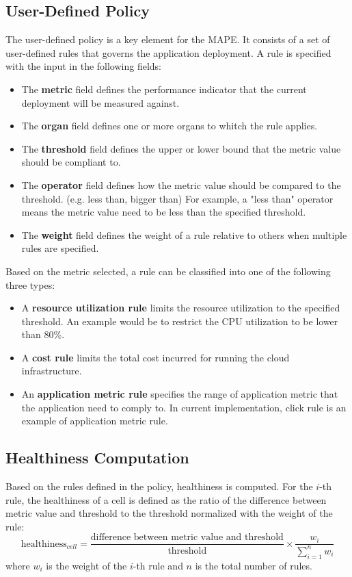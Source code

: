 \documentclass{seal_thesis}
\begin{document}
\subsection{User-Defined Policy}
The user-defined policy is a key element for the MAPE.
It consists of a set of user-defined rules that governs the application deployment.
A rule is specified with the input in the following fields:
\begin{itemize}
\item The \textbf{metric} field defines the performance indicator that the current deployment will be measured against.
\item The \textbf{organ} field defines one or more organs to whitch the rule applies.
\item The \textbf{threshold} field defines the upper or lower bound that the metric value should be compliant to.
\item The \textbf{operator} field defines how the metric value should be compared to the threshold. (e.g. less than, bigger than)
For example, a "less than" operator means the metric value need to be less than the specified threshold.
\item The \textbf{weight} field defines the weight of a rule relative to others when multiple rules are specified.
\end{itemize}
Based on the metric selected, a rule can be classified into one of the following three types:
\begin{itemize}
\item A \textbf{resource utilization rule} limits the resource utilization to the specified threshold.
An example would be to restrict the CPU utilization to be lower than 80\%.
\item A \textbf{cost rule} limits the total cost incurred for running the cloud infrastructure.
\item An \textbf{application metric rule} specifies the range of application metric that the application need to comply to.
In current implementation, click rule is an example of application metric rule.
\end{itemize}

\subsection{Healthiness Computation}
Based on the rules defined in the policy, healthiness is computed.
For the $i$-th rule, the healthiness of a cell is defined as the ratio of the difference between metric value and threshold to the threshold normalized with the weight of the rule:
\[ \textrm{healthiness}_{cell} = \frac{\textrm{difference between metric value and threshold}}{\textrm{threshold}} \times \frac{w_i}{\sum_{i=1}^{n}{w_i}}\]
where $w_i$ is the weight of the $i$-th rule and $n$ is the total number of rules.
\end{document}
